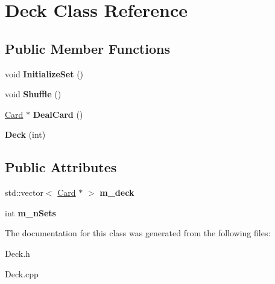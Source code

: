 \hypertarget{class_deck}{}\section{Deck Class Reference}
\label{class_deck}
\subsection*{Public Member Functions}
\begin{DoxyCompactItemize}
\item 
void {\bfseries Initialize\+Set} ()\hypertarget{class_deck_a0fea69180a61a2bb810ca18698ebc119}{}\label{class_deck_a0fea69180a61a2bb810ca18698ebc119}

\item 
void {\bfseries Shuffle} ()\hypertarget{class_deck_a1ed471063f40cb91c7e6786aa21737ef}{}\label{class_deck_a1ed471063f40cb91c7e6786aa21737ef}

\item 
\hyperlink{class_card}{Card} $\ast$ {\bfseries Deal\+Card} ()\hypertarget{class_deck_af4e4938969948cb4a471655cc4da3c90}{}\label{class_deck_af4e4938969948cb4a471655cc4da3c90}

\item 
{\bfseries Deck} (int)\hypertarget{class_deck_a5487610d44f13d27ef54c930e2bdadf9}{}\label{class_deck_a5487610d44f13d27ef54c930e2bdadf9}

\end{DoxyCompactItemize}
\subsection*{Public Attributes}
\begin{DoxyCompactItemize}
\item 
std\+::vector$<$ \hyperlink{class_card}{Card} $\ast$ $>$ {\bfseries m\+\_\+deck}\hypertarget{class_deck_ac27728877c50e97028566f9cb774408b}{}\label{class_deck_ac27728877c50e97028566f9cb774408b}

\item 
int {\bfseries m\+\_\+n\+Sets}\hypertarget{class_deck_af52c03d790a3182c7325d528839cd640}{}\label{class_deck_af52c03d790a3182c7325d528839cd640}

\end{DoxyCompactItemize}


The documentation for this class was generated from the following files\+:\begin{DoxyCompactItemize}
\item 
Deck.\+h\item 
Deck.\+cpp\end{DoxyCompactItemize}
